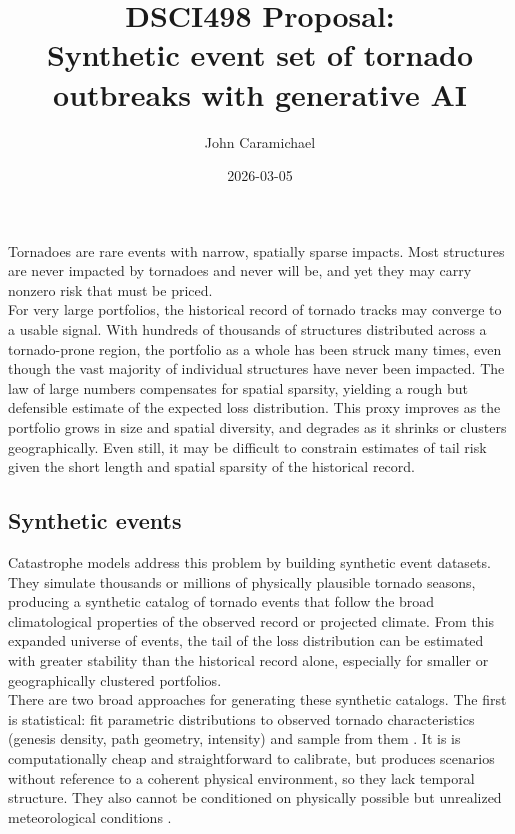 \documentclass{article}
\title{DSCI498 Proposal: \\ Synthetic event set of tornado outbreaks with generative AI}
\author{John Caramichael}
\date{2026-03-05}
\begin{document}
\maketitle

Tornadoes are rare events with narrow, spatially sparse impacts. Most structures are never impacted by tornadoes and never will be, and yet they may carry nonzero risk that must be priced. \\

For very large portfolios, the historical record of tornado tracks may converge to a usable signal. With hundreds of thousands of structures distributed across a tornado-prone region, the portfolio as a whole has been struck many times, even though the vast majority of individual structures have never been impacted. The law of large numbers compensates for spatial sparsity, yielding a rough but defensible estimate of the expected loss distribution. This proxy improves as the portfolio grows in size and spatial diversity, and degrades as it shrinks or clusters geographically. Even still, it may be difficult to constrain estimates of tail risk given the short length and spatial sparsity of the historical record. 

\subsection*{Synthetic events}

Catastrophe models address this problem by building synthetic event datasets. They simulate thousands or millions of physically plausible tornado seasons, producing a synthetic catalog of tornado events that follow the broad climatological properties of the observed record or projected climate. From this expanded universe of events, the tail of the loss distribution can be estimated with greater stability than the historical record alone, especially for smaller or geographically clustered portfolios. \\

There are two broad approaches for generating these synthetic catalogs. The first is statistical: fit parametric distributions to observed tornado characteristics (genesis density, path geometry, intensity) and sample from them \cite{fan2019statistical}. It is is computationally cheap and straightforward to calibrate, but produces scenarios without reference to a coherent physical environment, so they lack temporal structure. They also cannot be conditioned on physically possible but unrealized meteorological conditions \cite{malloy2026global}. \\
\end{document}
